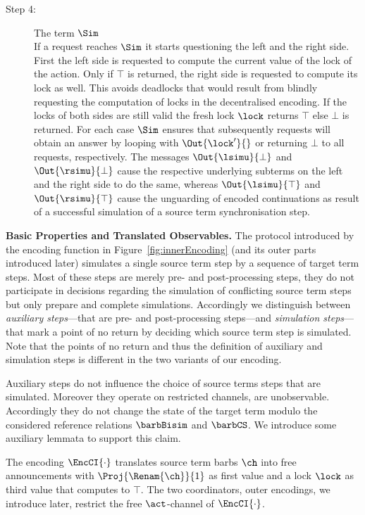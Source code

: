 \documentclass[copyright,creativecommons]{eptcs}
\begin{document}
\begin{description}
	\item[Step 4:] The term $ \Sim $\\
		If a request reaches $ \Sim $ it starts questioning the left and the right side. First the left side is requested to compute the current value of the lock of the action. Only if $ \top $ is returned, the right side is requested to compute its lock as well. This avoids deadlocks that would result from blindly requesting the computation of locks in the decentralised encoding. If the locks of both sides are still valid the fresh lock $ \lock $ returns $ \top $ else $ \bot $ is returned. For each case $ \Sim $ ensures that subsequently requests will obtain an answer by looping with $ \Out{\lock'}{} $ or returning $ \bot $ to all requests, respectively. The messages $ \Out{\lsimu}{\bot} $ and $ \Out{\rsimu}{\bot} $ cause the respective underlying subterms on the left and the right side to do the same, whereas $ \Out{\lsimu}{\top} $ and $ \Out{\rsimu}{\top} $ cause the unguarding of encoded continuations as result of a successful simulation of a source term synchronisation step.
\end{description}

\vspace{0.3em}
\noindent
\textbf{Basic Properties and Translated Observables.}\;
The protocol introduced by the encoding function in Figure~\ref{fig:innerEncoding} (and its outer parts introduced later) simulates a single source term step by a sequence of target term steps. Most of these steps are merely pre- and post-processing steps, \ie they do not participate in decisions regarding the simulation of conflicting source term steps but only prepare and complete simulations. Accordingly we distinguish between \emph{auxiliary steps}---that are pre- and post-processing steps---and \emph{simulation steps}---that mark a point of no return by deciding which source term step is simulated. Note that the points of no return and thus the definition of auxiliary and simulation steps is different in the two variants of our encoding.

Auxiliary steps do not influence the choice of source terms steps that are simulated. Moreover they operate on restricted channels, \ie are unobservable. Accordingly they do not change the state of the target term modulo the considered reference relations $ \barbBisim $ and $ \barbCS $. We introduce some auxiliary lemmata to support this claim.

The encoding $ \EncCI{\cdot} $ translates source term barbs $ \ch $ into free announcements with $ \Proj{\Renam{\ch}}{1} $ as first value and a lock $ \lock $ as third value that computes to $ \top $. The two coordinators, \ie outer encodings, we introduce later, restrict the free $ \act $-channel of $ \EncCI{\cdot} $.
\end{document}
